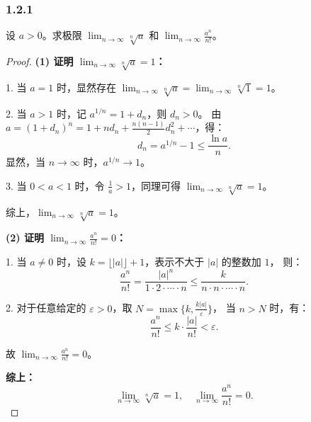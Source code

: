 \documentclass[12pt]{ctexart}
\begin{document}
\subsubsection*{1.2.1} 
设 $a > 0$。求极限 $\lim_{n \to \infty} \sqrt[n]{a}$ 和 $\lim_{n \to \infty} \frac{a^n}{n!}$。
\begin{proof}
\textbf{(1) 证明 $\lim_{n \to \infty} \sqrt[n]{a} = 1$：}

1. 当 $a = 1$ 时，显然存在 $\lim_{n \to \infty} \sqrt[n]{a} = \lim_{n \to \infty} \sqrt[n]{1} = 1$。

2. 当 $a > 1$ 时，记 $a^{1/n} = 1 + d_n$，则 $d_n > 0$。  
由 $a = (1 + d_n)^n = 1 + n d_n + \frac{n(n-1)}{2} d_n^2 + \cdots$，得：
\[
d_n = a^{1/n} - 1 \leq \frac{\ln a}{n}.
\]
显然，当 $n \to \infty$ 时，$a^{1/n} \to 1$。

3. 当 $0 < a < 1$ 时，令 $\frac{1}{a} > 1$，同理可得 $\lim_{n \to \infty} \sqrt[n]{a} = 1$。

综上，$\lim_{n \to \infty} \sqrt[n]{a} = 1$。

\textbf{(2) 证明 $\lim_{n \to \infty} \frac{a^n}{n!} = 0$：}

1. 当 $a \neq 0$ 时，设 $k = \lfloor |a| \rfloor + 1$，表示不大于 $|a|$ 的整数加 $1$，  
则：
\[
\frac{a^n}{n!} = \frac{|a|^n}{1 \cdot 2 \cdot \cdots \cdot n} \leq \frac{k}{n \cdot n \cdot \cdots \cdot n}.
\]

2. 对于任意给定的 $\varepsilon > 0$，取 $N = \max\{k, \frac{k |a|}{\varepsilon}\}$，  
当 $n > N$ 时，有：
\[
\frac{a^n}{n!} \leq k \cdot \frac{|a|}{n!} < \varepsilon.
\]

故 $\lim_{n \to \infty} \frac{a^n}{n!} = 0$。

\textbf{综上：}
\[
\lim_{n \to \infty} \sqrt[n]{a} = 1, \quad \lim_{n \to \infty} \frac{a^n}{n!} = 0.
\]
\end{proof}
\end{document}

